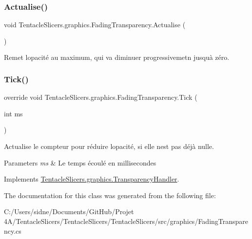 \subsubsection{\texorpdfstring{Actualise()}{Actualise()}}
{\footnotesize\ttfamily void Tentacle\+Slicers.\+graphics.\+Fading\+Transparency.\+Actualise (\begin{DoxyParamCaption}{ }\end{DoxyParamCaption})}



Remet l\textquotesingle{}opacité au maximum, qui va diminuer progressivemetn jusqu\textquotesingle{}à zéro. 

\mbox{\label{class_tentacle_slicers_1_1graphics_1_1_fading_transparency_a0558563624c4749be727bfd0aefb293e}} 
\subsubsection{\texorpdfstring{Tick()}{Tick()}}
{\footnotesize\ttfamily override void Tentacle\+Slicers.\+graphics.\+Fading\+Transparency.\+Tick (\begin{DoxyParamCaption}\item[{int}]{ms }\end{DoxyParamCaption})\hspace{0.3cm}{\ttfamily [virtual]}}



Actualise le compteur pour réduire l\textquotesingle{}opacité, si elle n\textquotesingle{}est pas déjà nulle. 


\begin{DoxyParams}{Parameters}
{\em ms} & Le temps écoulé en millisecondes \\
\hline
\end{DoxyParams}


Implements \hyperlink{class_tentacle_slicers_1_1graphics_1_1_transparency_handler_ab0f18e90768c180b0f804e1531a7c210}{Tentacle\+Slicers.\+graphics.\+Transparency\+Handler}.



The documentation for this class was generated from the following file\+:\begin{DoxyCompactItemize}
\item 
C\+:/\+Users/sidne/\+Documents/\+Git\+Hub/\+Projet 4\+A/\+Tentacle\+Slicers/\+Tentacle\+Slicers/\+Tentacle\+Slicers/src/graphics/Fading\+Transparency.\+cs\end{DoxyCompactItemize}

